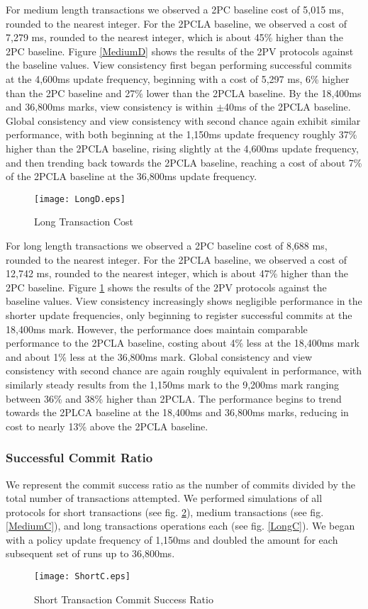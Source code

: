 \documentclass[11pt]{article}
\begin{document}
For medium length transactions we observed a 2PC baseline cost of 5,015 ms, rounded to the nearest integer. For the 2PCLA baseline, we observed a cost of 7,279 ms, rounded to the nearest integer, which is about 45\% higher than the 2PC baseline. Figure \ref{MediumD} shows the results of the 2PV protocols against the baseline values. View consistency first began performing successful commits at the 4,600ms update frequency, beginning with a cost of 5,297 ms, 6\% higher than the 2PC baseline and 27\% lower than the 2PCLA baseline. By the 18,400ms and 36,800ms marks, view consistency is within $\pm$40ms of the 2PCLA baseline. Global consistency and view consistency with second chance again exhibit similar performance, with both beginning at the 1,150ms update frequency roughly 37\% higher than the 2PCLA baseline, rising slightly at the 4,600ms update frequency, and then trending back towards the 2PCLA baseline, reaching a cost of about 7\% of the 2PCLA baseline at the 36,800ms update frequency.
\begin{figure}[h]
\begin{center}
\texttt{[image: LongD.eps]}
\caption{Long Transaction Cost}
\label{LongD}
\end{center}
\end{figure}

For long length transactions we observed a 2PC baseline cost of 8,688 ms, rounded to the nearest integer. For the 2PCLA baseline, we observed a cost of 12,742 ms, rounded to the nearest integer, which is about 47\% higher than the 2PC baseline. Figure \ref{LongD} shows the results of the 2PV protocols against the baseline values. View consistency increasingly shows negligible performance in the shorter update frequencies, only beginning to register successful commits at the 18,400ms mark. However, the performance does maintain comparable performance to the 2PCLA baseline, costing about 4\% less at the 18,400ms mark and about 1\% less at the 36,800ms mark. Global consistency and view consistency with second chance are again roughly equivalent in performance, with similarly steady results from the 1,150ms mark to the 9,200ms mark ranging between 36\% and 38\% higher than 2PCLA. The performance begins to trend towards the 2PLCA baseline at the 18,400ms and 36,800ms marks, reducing in cost to nearly 13\% above the 2PCLA baseline.
\subsubsection{Successful Commit Ratio}
We represent the commit success ratio as the number of commits divided by the total number of transactions attempted. We performed simulations of all protocols for short transactions (see fig. \ref{ShortC}), medium transactions (see fig. \ref{MediumC}), and long transactions operations each (see fig. \ref{LongC}). We began with a policy update frequency of 1,150ms and doubled the amount for each subsequent set of runs up to 36,800ms.
\begin{figure}[h]
\begin{center}
\texttt{[image: ShortC.eps]}
\caption{Short Transaction Commit Success Ratio}
\label{ShortC}
\end{center}
\end{figure}
\end{document}
